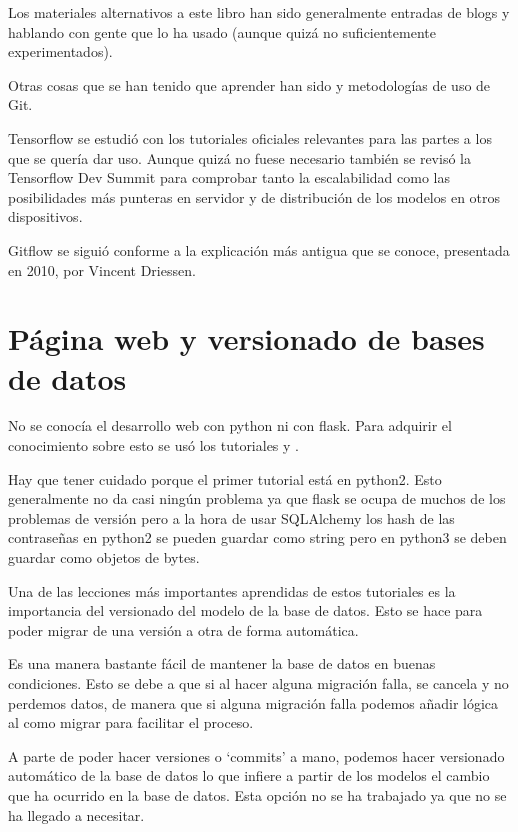 Los materiales alternativos a este libro han sido  generalmente entradas de blogs y hablando con gente que lo ha usado (aunque quizá no suficientemente experimentados). \cite{fow06}
\cite{dancont}

Otras cosas que se han tenido que aprender han sido  y metodologías de uso de Git\cite{vin10}. 

Tensorflow se estudió con los tutoriales oficiales relevantes para las partes a los que se quería dar uso. Aunque quizá no fuese necesario también se revisó la Tensorflow Dev Summit \cite{tfds} para comprobar tanto la escalabilidad como las posibilidades más punteras en servidor y de distribución de los modelos en otros dispositivos.

Gitflow se siguió conforme a la explicación más antigua que se conoce, presentada en 2010, por Vincent Driessen. \cite{vin10}

\section{Página web y versionado de bases de datos}

No se conocía el desarrollo web con python ni con flask. Para adquirir el conocimiento sobre esto se usó los tutoriales  y .

Hay que tener cuidado porque el primer tutorial está en python2. Esto generalmente no da casi ningún problema ya que flask se ocupa de muchos de los problemas de versión pero a la hora de usar SQLAlchemy los hash de las contraseñas en python2 se pueden guardar como string pero en python3 se deben guardar como objetos de bytes.

Una de las lecciones más importantes aprendidas de estos tutoriales es la importancia del versionado del modelo de la base de datos. Esto se hace para poder migrar de una versión a otra de forma automática. 

Es una manera bastante fácil de mantener la base de datos en buenas condiciones. Esto se debe a que si al hacer alguna migración falla, se cancela y no perdemos datos, de manera que si alguna migración falla podemos añadir lógica al como migrar para facilitar el proceso.

A parte de poder hacer versiones o `commits' a mano, podemos hacer versionado automático de la base de datos lo que infiere a partir de los modelos el cambio que ha ocurrido en la base de datos. Esta opción no se ha trabajado ya que no se ha llegado a necesitar.

